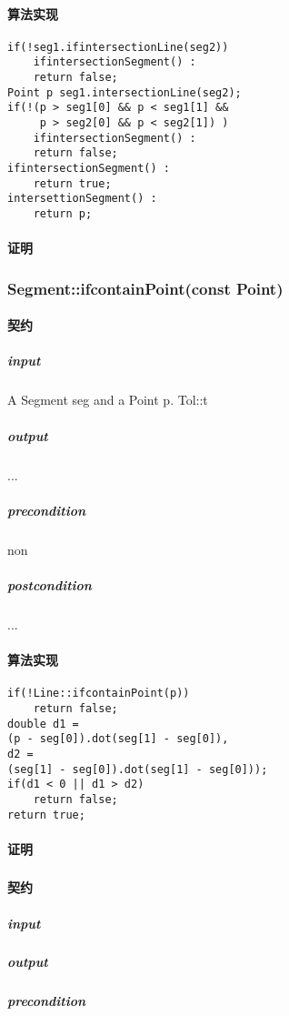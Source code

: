 \documentclass[a4paper]{book}
\numberwithin{equation}{chapter}
\theoremstyle{definition}
\begin{document}
\begin{multicols}{2}
\paragraph{算法实现}
\begin{lstlisting}
if(!seg1.ifintersectionLine(seg2))
	ifintersectionSegment() : 
	return false;
Point p seg1.intersectionLine(seg2);
if(!(p > seg1[0] && p < seg1[1] &&
     p > seg2[0] && p < seg2[1]) )
   	ifintersectionSegment() :
   	return false;
ifintersectionSegment() :
   	return true;
intersettionSegment() :
	return p;
\end{lstlisting}
\paragraph{证明}

\subsubsection{Segment::ifcontainPoint(const Point)}
\paragraph{契约}
\subparagraph{input}
A Segment seg and a Point p. Tol::t
\subparagraph{output}
...
\subparagraph{precondition}
non
\subparagraph{postcondition}
...
\paragraph{算法实现}
\begin{lstlisting}
if(!Line::ifcontainPoint(p)) 
	return false;
double d1 = 
(p - seg[0]).dot(seg[1] - seg[0]),
d2 = 
(seg[1] - seg[0]).dot(seg[1] - seg[0]));
if(d1 < 0 || d1 > d2)
	return false;
return true;	
\end{lstlisting}
\paragraph{证明}

\subsubsection{}
\paragraph{契约}
\subparagraph{input}

\subparagraph{output}

\subparagraph{precondition}


\end{multicols}
\end{document}
